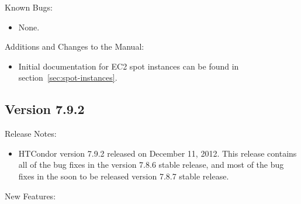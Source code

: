 \noindent Known Bugs:

\begin{itemize}

\item None.

\end{itemize}

\noindent Additions and Changes to the Manual:

\begin{itemize}

\item Initial documentation for EC2 spot instances can be found
in section~\ref{sec:spot-instances}.

\end{itemize}


\subsection*{\label{sec:New-7-9-2}Version 7.9.2}

\noindent Release Notes:

\begin{itemize}

\item HTCondor version 7.9.2 released on December 11, 2012.
This release contains all of the bug fixes in the version 7.8.6 
stable release,
and most of the bug fixes in the
soon to be released version 7.8.7 stable release.

\end{itemize}


\noindent New Features:

